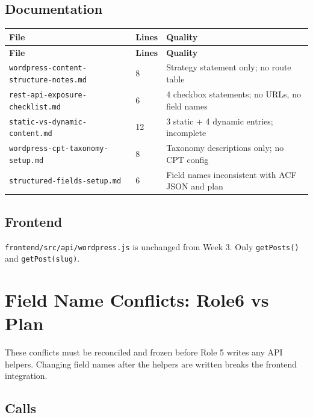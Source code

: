 \documentclass[12pt,a4paper]{article}
\begin{document}
\subsection{Documentation}

\begin{longtable}{@{}p{6cm}p{1.5cm}p{4.8cm}@{}}
\toprule
\rowcolor{uvtLightBlue}
\textbf{File} & \textbf{Lines} & \textbf{Quality} \\
\midrule
\endfirsthead
\toprule
\rowcolor{uvtLightBlue}
\textbf{File} & \textbf{Lines} & \textbf{Quality} \\
\midrule
\endhead
\bottomrule
\endfoot
\texttt{wordpress-content-structure-notes.md} & 8 & Strategy statement only; no route table \\
\texttt{rest-api-exposure-checklist.md} & 6 & 4 checkbox statements; no URLs, no field names \\
\texttt{static-vs-dynamic-content.md} & 12 & 3 static + 4 dynamic entries; incomplete \\
\texttt{wordpress-cpt-taxonomy-setup.md} & 8 & Taxonomy descriptions only; no CPT config \\
\texttt{structured-fields-setup.md} & 6 & Field names inconsistent with ACF JSON and plan \\
\end{longtable}

\subsection{Frontend}

\texttt{frontend/src/api/wordpress.js} is unchanged from Week 3. Only \texttt{getPosts()} and \texttt{getPost(slug)}.

\section{Field Name Conflicts: Role6 vs Plan}

\begin{darkbox}
These conflicts must be reconciled and frozen before Role 5 writes any API helpers.
Changing field names after the helpers are written breaks the frontend integration.
\end{darkbox}

\subsection{Calls}
\end{document}
